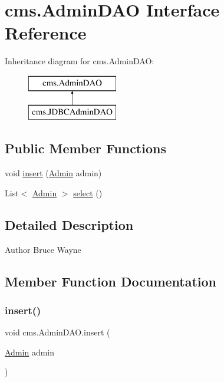 \hypertarget{interfacecms_1_1_admin_d_a_o}{}\section{cms.\+Admin\+D\+AO Interface Reference}
\label{interfacecms_1_1_admin_d_a_o}
Inheritance diagram for cms.\+Admin\+D\+AO\+:\begin{figure}[H]
\begin{center}
\leavevmode
\includegraphics[height=2.000000cm]{interfacecms_1_1_admin_d_a_o}
\end{center}
\end{figure}
\subsection*{Public Member Functions}
\begin{DoxyCompactItemize}
\item 
void \mbox{\hyperlink{interfacecms_1_1_admin_d_a_o_ae4de78db63d901e5855f242d5ae06869}{insert}} (\mbox{\hyperlink{classcms_1_1_admin}{Admin}} admin)
\item 
List$<$ \mbox{\hyperlink{classcms_1_1_admin}{Admin}} $>$ \mbox{\hyperlink{interfacecms_1_1_admin_d_a_o_a3e45698575b289bb1772162a6f332d2e}{select}} ()
\end{DoxyCompactItemize}


\subsection{Detailed Description}
\begin{DoxyAuthor}{Author}
Bruce Wayne 
\end{DoxyAuthor}


\subsection{Member Function Documentation}
\mbox{\label{interfacecms_1_1_admin_d_a_o_ae4de78db63d901e5855f242d5ae06869}} 
\subsubsection{\texorpdfstring{insert()}{insert()}}
{\footnotesize\ttfamily void cms.\+Admin\+D\+A\+O.\+insert (\begin{DoxyParamCaption}\item[{\mbox{\hyperlink{classcms_1_1_admin}{Admin}}}]{admin }\end{DoxyParamCaption})}



